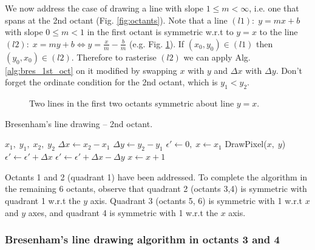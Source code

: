 \documentclass[a4paper]{article}
\begin{document}
We now address the case of drawing a line with slope $1 \leq m < \infty$, i.e. one that spans at the 2nd octant (Fig. \ref{fig:octants}). Note that a line $(l1): \; y=mx+b$ with slope $0 \leq m < 1$ in the first octant is symmetric w.r.t to $y=x$ to the line $(l2): \; x=my+b \Leftrightarrow y = \frac{x}{m} - \frac{b}{m}$ (e.g. Fig. \ref{fig:symmetric_lines_octants_1_2}). If $(x_0,y_0)\in(l1)$ then $(y_0,x_0)\in (l2)$. Therefore to rasterise $(l2)$ we can apply Alg. \ref{alg:bres_1st_oct} on it modified by swapping $x$ with $y$ and $\Delta x$ with $\Delta y$. Don't forget the ordinate condition for the 2nd octant, which is $y_1<y_2$.
\begin{figure}[H]
	\centering
	
	\caption{Two lines in the first two octants symmetric about line $y=x$.}
	\label{fig:symmetric_lines_octants_1_2}
\end{figure}
\begin{algorithm}[H]
\caption{Bresenham's line drawing -- 2nd octant.}
\label{alg:bres_2nd_oct}
\begin{algorithmic}[1]
 {$x_1,\; y_1,\; x_2,\; y_2$} 
	\State $\Delta x \leftarrow x_2 - x_1$
	\State $\Delta y \leftarrow y_2 - y_1$
	\State $\epsilon' \leftarrow 0, \; x\leftarrow x_1$ 
			\State DrawPixel($x,\; y$)
				\State $\epsilon' \leftarrow \epsilon' + \Delta x$ 
			\Else
				\State $\epsilon' \leftarrow \epsilon' + \Delta x - \Delta y$ 
				\State $x\leftarrow x + 1$
			\EndIf
		\EndFor
	\EndIf
\EndProcedure
\end{algorithmic}
\end{algorithm}
Octants 1 and 2 (quadrant 1) have been addressed. To complete the algorithm in the remaining 6 octants, observe that quadrant 2 (octants 3,4) is symmetric with quadrant 1 w.r.t the $y$ axis. Quadrant 3 (octants 5, 6) is symmetric with 1 w.r.t $x$ and $y$ axes, and quadrant 4 is symmetric with 1 w.r.t the $x$ axis.


\subsubsection{Bresenham's line drawing algorithm in octants 3 and 4}
\end{document}
